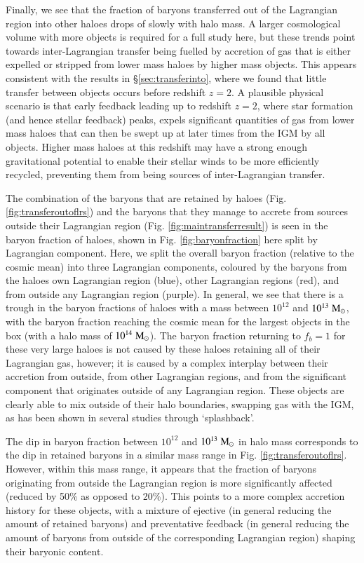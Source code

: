 Finally, we see that the fraction of baryons transferred out of the Lagrangian
region into other haloes drops of slowly with halo mass. A larger cosmological
volume with more objects is required for a full study here, but these trends
point towards inter-Lagrangian transfer being fuelled by accretion of gas
that is either expelled or stripped from lower mass haloes by higher mass
objects. This appears consistent with the results in \S \ref{sec:transferinto},
where we found that little transfer between objects occurs before redshift
$z=2$. A plausible physical scenario is that early feedback leading up to
redshift $z=2$, where star formation (and hence stellar feedback) peaks,
expels significant quantities of gas from lower mass haloes that can then be
swept up at later times from the IGM by all objects. Higher mass haloes at this
redshift may have a strong enough gravitational potential to enable their stellar
winds to be more efficiently recycled, preventing them from being sources
of inter-Lagrangian transfer.

The combination of the baryons that are retained by haloes (Fig.
\ref{fig:transferoutoflrs}) and the baryons that they manage to accrete from
sources outside their Lagrangian region (Fig. \ref{fig:maintransferresult})
is seen in the baryon fraction of haloes, shown in Fig.
\ref{fig:baryonfraction} here split by Lagrangian component. Here, we split
the overall baryon fraction (relative to the cosmic mean) into three
Lagrangian components, coloured by the baryons from the haloes own Lagrangian
region (blue), other Lagrangian regions (red), and from outside any
Lagrangian region (purple). In general, we see that there is a trough in the
baryon fractions of haloes with a mass between $10^{12}$ and
$10^{13}\;{\rm M}_{\odot}{}$, with the baryon fraction reaching the cosmic mean for the
largest objects in the box (with a halo mass of $10^{14}\;{\rm M}_{\odot}{}$). The
baryon fraction returning to $f_b = 1$ for these very large haloes is not
caused by these haloes retaining all of their Lagrangian gas, however; it is
caused by a complex interplay between their accretion from outside, from
other Lagrangian regions, and from the significant component that originates
outside of any Lagrangian region. These objects are clearly able to mix
outside of their halo boundaries, swapping gas with the IGM, as has been
shown in several studies \cite{Mansfield2017, Diemer2017} through `splashback'.

The dip in baryon fraction between $10^{12}$ and $10^{13}\;{\rm M}_{\odot}{}$ in halo
mass corresponds to the dip in retained baryons in a similar mass range in
Fig. \ref{fig:transferoutoflrs}. However, within this mass range, it appears
that the fraction of baryons originating from outside the Lagrangian region is
more significantly affected (reduced by 50\% as opposed to 20\%). This points
to a more complex accretion history for these objects, with a mixture of
ejective (in general reducing the amount of retained baryons) and preventative
feedback (in general reducing the amount of baryons from outside of the
corresponding Lagrangian region) shaping their baryonic content.

